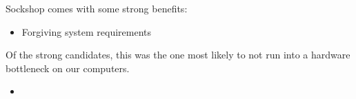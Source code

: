 Sockshop comes with some strong benefits:

\begin{itemize}
    \item Forgiving system requirements
\end{itemize}

Of the strong candidates, this was the one most likely to not run into a hardware bottleneck on our computers. 

\begin{itemize}
    \item 
\end{itemize}